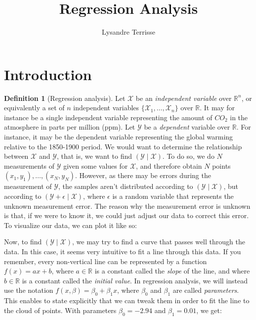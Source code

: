\documentclass{article}
\title{Regression Analysis}
\author{Lysandre Terrisse}
\theoremstyle{definition}
\newtheorem{definition}{Definition}[section]
\theoremstyle{remark}
\theoremstyle{example}
\begin{document}
\maketitle

\section{Introduction}

\begin{definition}[Regression analysis]
		Let $\mathcal{X}$ be an \textit{independent variable} over $\mathbb{R}^n$, or equivalently a set of $n$ independent variables $\{\mathcal{X}_1, \dots, \mathcal{X}_n\}$ over $\mathbb{R}$. It may for instance be a single independent variable representing the amount of $CO_2$ in the atmosphere in parts per million (ppm). Let $\mathcal{Y}$ be a \textit{dependent} variable over $\mathbb{R}$. For instance, it may be the dependent variable representing the global warming relative to the 1850-1900 period. We would want to determine the relationship between $\mathcal{X}$ and $\mathcal{Y}$, that is, we want to find $(\mathcal{Y} \mid \mathcal{X})$. To do so, we do $N$ measurements of $\mathcal{Y}$ given some values for $\mathcal{X}$, and therefore obtain $N$ points $(x_1, y_1), \dots, (x_N, y_N)$. However, as there may be errors during the measurement of $\mathcal{Y}$, the samples aren't distributed according to $(\mathcal{Y} \mid \mathcal{X})$, but according to $(\mathcal{Y} + \epsilon \mid \mathcal{X})$, where $\epsilon$ is a random variable that represents the unknown measurement error. The reason why the measurement error is unknown is that, if we were to know it, we could just adjust our data to correct this error. To visualize our data, we can plot it like so:

\begin{figure}[h!]
		\centering
		\scalebox{0.9}{}
\end{figure}

		Now, to find $(\mathcal{Y} \mid \mathcal{X})$, we may try to find a curve that passes well through the data. In this case, it seems very intuitive to fit a line through this data. If you remember, every non-vertical line can be represented by a function $f(x) = ax + b$, where $a \in \mathbb{R}$ is a constant called the \textit{slope} of the line, and where $b \in \mathbb{R}$ is a constant called the \textit{initial value}. In regression analysis, we will instead use the notation $f(x, \beta) = \beta_0 + \beta_1 x$, where $\beta_0$ and $\beta_1$ are called \textit{parameters}. This enables to state explicitly that we can tweak them in order to fit the line to the cloud of points. With parameters $\beta_0 = -2.94$ and $\beta_1 = 0.01$, we get:


\end{definition}
\end{document}
